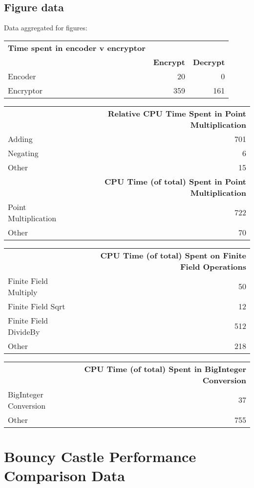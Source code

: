 \subsection{Figure data}

Data aggregated for figures:

\begin{tabular}{|l|r|r|}
	\hline
	\textbf{Time spent in encoder v encryptor} \\
	& \textbf{Encrypt} & \textbf{Decrypt} \\
	Encoder & 20 & 0 \\
	Encryptor & 359 & 161 \\
	\hline
\end{tabular}

\begin{tabular}{|l|r|}
	\hline
	& \textbf{Relative CPU Time Spent in Point Multiplication} \\
	Adding & 701 \\
	Negating & 6 \\
	Other & 15 \\
	\hline
	& \textbf{CPU Time (of total) Spent in Point Multiplication} \\
	Point Multiplication & 722 \\
	Other & 70 \\
	\hline
\end{tabular}

\begin{tabular}{|l|r|}
	\hline
	& \textbf{CPU Time (of total) Spent on Finite Field Operations} \\
	Finite Field Multiply & 50 \\
	Finite Field Sqrt & 12 \\
	Finite Field DivideBy & 512 \\
	Other & 218 \\
	\hline
\end{tabular}

\begin{tabular}{|l|r|}
	\hline
	& \textbf{CPU Time (of total) Spent in BigInteger Conversion} \\
	BigInteger Conversion & 37 \\
	Other & 755 \\
	\hline
\end{tabular}

\section{Bouncy Castle Performance Comparison Data}
\label{app:bc-performance-data}